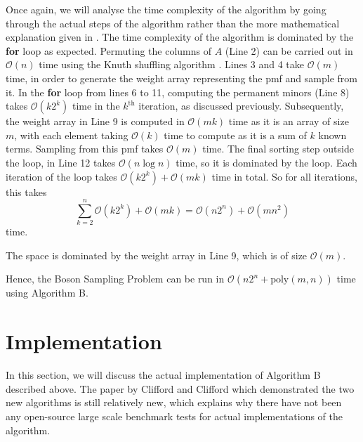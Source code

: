 \documentclass[11pt]{article}
\theoremstyle{theorem}
\theoremstyle{remark}
\theoremstyle{plain}
\theoremstyle{definition}
\begin{document}
Once again, we will analyse the time complexity of the algorithm by going through the actual steps of the algorithm rather than the more mathematical explanation given in \cite{clifford17}. The time complexity of the algorithm is dominated by the \textbf{for} loop as expected. Permuting the columns of $A$ (Line 2) can be carried out in $\mathcal{O}(n)$ time using the Knuth shuffling algorithm \cite{knuth1969}. Lines 3 and 4 take $\mathcal{O}(m)$ time, in order to generate the weight array representing the pmf and sample from it. In the \textbf{for} loop from lines 6 to 11, computing the permanent minors (Line 8) takes $\mathcal{O}(k 2^k)$ time in the $k^{\text{th}}$ iteration, as discussed previously. Subsequently, the weight array in Line 9 is computed in $\mathcal{O}(mk)$ time as it is an array of size $m$, with each element taking $\mathcal{O}(k)$ time to compute as it is a sum of $k$ known terms. Sampling from this pmf takes $\mathcal{O}(m)$ time. The final sorting step outside the loop, in Line 12 takes $\mathcal{O}(n \log n)$ time, so it is dominated by the loop. Each iteration of the loop takes $\mathcal{O}(k 2^k) + \mathcal{O}(mk)$ time in total. So for all iterations, this takes
\begin{equation}
\sum_{k=2}^n \mathcal{O}(k2^k) + \mathcal{O}(mk) = \mathcal{O}(n2^n) + \mathcal{O}(mn^2)
\end{equation}
time. 

The space is dominated by the weight array in Line 9, which is of size $\mathcal{O}(m)$.

Hence, the Boson Sampling Problem can be run in $\mathcal{O}(n2^n + \text{poly}(m, n))$ time using Algorithm B.

\section{Implementation} %

In this section, we will discuss the actual implementation of Algorithm B described above. The paper by Clifford and Clifford which demonstrated the two new algorithms is still relatively new, which explains why there have not been any open-source large scale benchmark tests for actual implementations of the algorithm.
\end{document}
